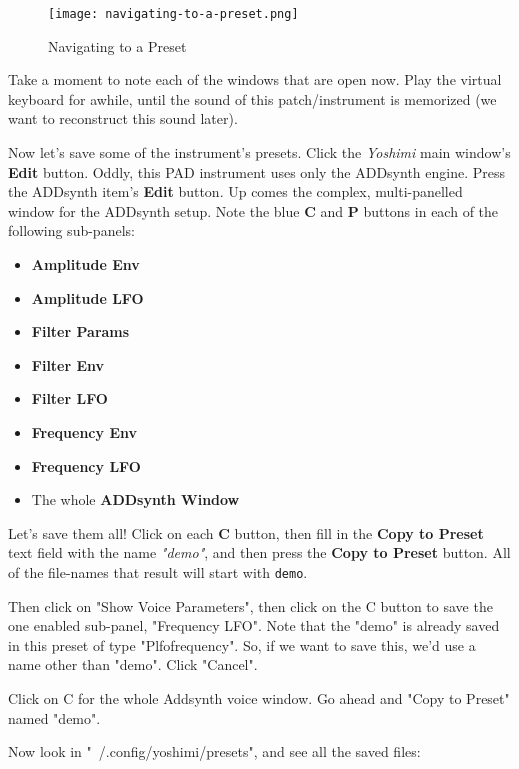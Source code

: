 \begin{figure}[H]
   \centering 
   \texttt{[image: navigating-to-a-preset.png]}
   \caption{Navigating to a Preset}
   \label{fig:presets_navigating_to_a_preset}
\end{figure}

   Take a moment to note each of the windows that are open now.
   Play the virtual keyboard for awhile, until the sound of this
   patch/instrument is memorized (we want to reconstruct this sound later).

   Now let's save some of the instrument's presets.
   Click the \textsl{Yoshimi} main window's \textbf{Edit} button.
   Oddly, this PAD instrument uses only the ADDsynth engine.
   Press the ADDsynth item's \textbf{Edit} button.
   Up comes the complex, multi-panelled window for the ADDsynth setup.
   Note the blue \textbf{C} and \textbf{P} buttons in each of the following
   sub-panels:

   \begin{itemize}
      \item \textbf{Amplitude Env}
      \item \textbf{Amplitude LFO}
      \item \textbf{Filter Params}
      \item \textbf{Filter Env}
      \item \textbf{Filter LFO}
      \item \textbf{Frequency Env}
      \item \textbf{Frequency LFO}
      \item The whole \textbf{ADDsynth Window}
   \end{itemize}

   Let's save them all!  Click on each \textbf{C} button,
   then fill in the \textbf{Copy to Preset} text field with
   the name \textsl{"demo"}, and then press the \textbf{Copy to Preset}
   button.  All of the file-names that result will start with
   \texttt{demo}.

   Then click on "Show Voice Parameters", then click on the C
   button to save the one enabled sub-panel, "Frequency LFO".
   Note that the "demo" is already saved in this preset of
   type "Plfofrequency".  So, if we want to save this, we'd use a name other
   than "demo".  Click "Cancel".

   Click on C for the whole Addsynth voice window.  Go ahead and
   "Copy to Preset" named "demo".

   Now look in "~/.config/yoshimi/presets", and see all the saved files:


